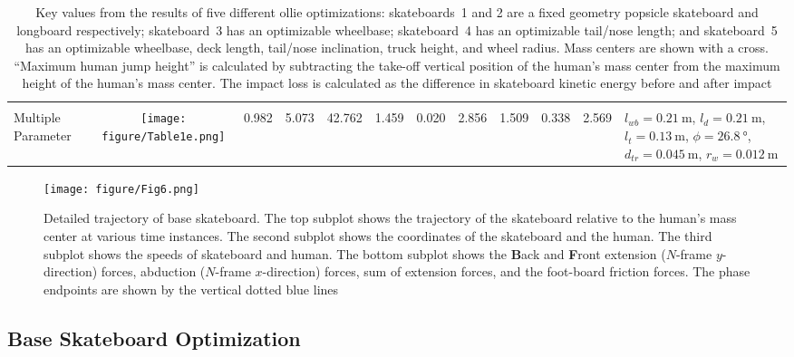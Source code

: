 \documentclass[default,iicol,pdflatex]{sn-jnl}
\begin{document}
\begin{table*}
\begin{center}
{\begin{tabular}{p{1.6cm} c p{1.2cm} p{1.2cm} p{1.2cm} p{1.2cm} p{1.2cm} p{1.2cm} p{1.2cm} p{1.2cm} p{1.2cm} m{4.3cm}}
    & & & & & & & & & & & \\

    Multiple Parameter & \texttt{[image: figure/Table1e.png]}   
    & 0.982        & 5.073     & 42.762     & 1.459    & 0.020   & 2.856   & 1.509     & 0.338     & 2.569
    & $l_{wb}=\SI{0.21}{\meter}$, $l_d=\SI{0.21}{\meter}$, \newline $l_t=\SI{0.13}{\meter}$, $\phi=\SI{26.8}{\degree}$, \newline $d_{tr}=\SI{0.045}{\meter}$, $r_w=\SI{0.012}{\meter}$ \\
    
    \bottomrule
  \end{tabular}}
  \end{center}
    \caption[Results benchmarks]{Key values from the results of five different ollie optimizations: skateboards~1 and 2 are a fixed geometry popsicle skateboard and longboard respectively; skateboard~3 has an optimizable wheelbase; skateboard~4 has an optimizable tail/nose length; and skateboard~5 has an optimizable wheelbase, deck length, tail/nose inclination, truck height, and wheel radius. Mass centers are shown with a cross. ``Maximum human jump height'' is calculated by subtracting the take-off vertical position of the human's mass center from the maximum height of the human's mass center. The impact loss is calculated as the difference in skateboard kinetic energy before and after impact}
    \label{fig:resultstable}
\end{table*}

\begin{figure*}
    \centering
    \texttt{[image: figure/Fig6.png]}
    \caption[Trajectory, positions, speeds, and forces of base optimization]{Detailed trajectory of base skateboard. The top subplot shows the trajectory of the skateboard relative to the human's mass center at various time instances. The second subplot shows the coordinates of the skateboard and the human. The third subplot shows the speeds of skateboard and human. The bottom subplot shows the \textbf{B}ack and \textbf{F}ront extension ($N$-frame $y$-direction) forces, abduction ($N$-frame $x$-direction) forces, sum of extension forces, and the  foot-board friction forces. The phase endpoints are shown by the vertical dotted blue lines}\label{f_noparameter}
\end{figure*}

\subsection{Base Skateboard Optimization}
\end{document}
